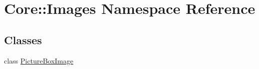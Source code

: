 \hypertarget{namespace_core_1_1_images}{
\section{Core::Images Namespace Reference}
\label{namespace_core_1_1_images}
}
\subsection*{Classes}
\begin{DoxyCompactItemize}
\item 
class \hyperlink{class_core_1_1_images_1_1_picture_box_image}{PictureBoxImage}
\end{DoxyCompactItemize}
